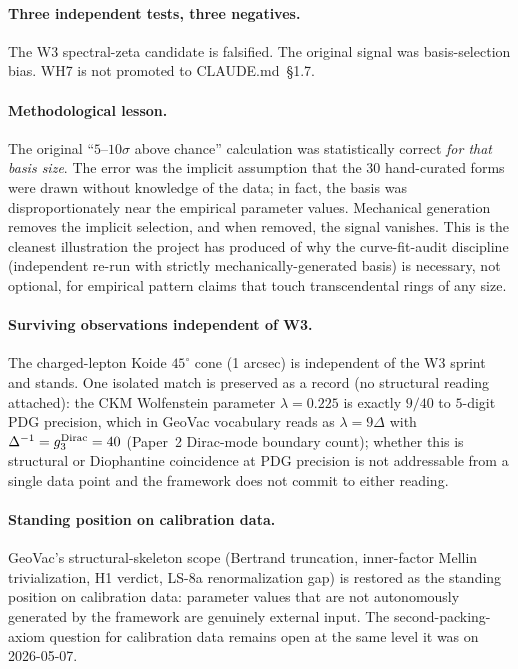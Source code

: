 \documentclass[11pt]{article}
\begin{document}
\paragraph{Three independent tests, three negatives.}
The W3 spectral-zeta candidate is falsified.  The original signal was
basis-selection bias.  WH7 is not promoted to CLAUDE.md~\S 1.7.

\paragraph{Methodological lesson.}
The original ``$5$--$10\sigma$ above chance'' calculation was
statistically correct \emph{for that basis size}.  The error was the
implicit assumption that the 30 hand-curated forms were drawn without
knowledge of the data; in fact, the basis was disproportionately near
the empirical parameter values.  Mechanical generation removes the
implicit selection, and when removed, the signal vanishes.  This is
the cleanest illustration the project has produced of why the
curve-fit-audit discipline (independent re-run with strictly
mechanically-generated basis) is necessary, not optional, for
empirical pattern claims that touch transcendental rings of any
size.

\paragraph{Surviving observations independent of W3.}
The charged-lepton Koide $45^\circ$ cone (1 arcsec) is independent of
the W3 sprint and stands.  One isolated match is preserved as a
record (no structural reading attached): the CKM Wolfenstein
parameter $\lambda = 0.225$ is exactly $9/40$ to $5$-digit PDG
precision, which in GeoVac vocabulary reads as $\lambda = 9\Delta$
with $\Delta^{-1} = g_3^{\rm Dirac} = 40$ (Paper~2 Dirac-mode
boundary count); whether this is structural or Diophantine
coincidence at PDG precision is not addressable from a single data
point and the framework does not commit to either reading.

\paragraph{Standing position on calibration data.}
GeoVac's structural-skeleton scope (Bertrand truncation, inner-factor
Mellin trivialization, H1 verdict, LS-8a renormalization gap)
is restored as the standing position on calibration data: parameter
values that are not autonomously generated by the framework are
genuinely external input.  The second-packing-axiom question for
calibration data remains open at the same level it was on
2026-05-07.
\end{document}
